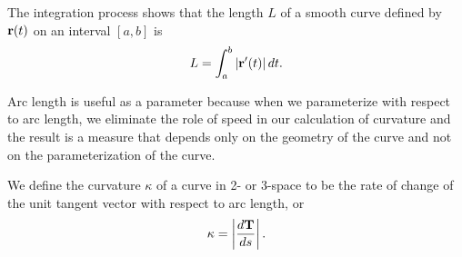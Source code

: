 


\begin{summary}
\item The integration process shows that the length $L$ of a smooth curve defined by $\mathbf{r}(t)$ on an interval $[a,b]$ is
\[L = \int_a^b |\mathbf{r}'(t)| \, dt.\]
\item Arc length is useful as a parameter because when we parameterize with respect to arc length, we eliminate the role of speed in our calculation of curvature and the result is a measure that depends only on the geometry of the curve and not on the parameterization of the curve.
\item We define the curvature $\kappa$ of a curve in 2- or 3-space to be the rate of change of the unit tangent vector with respect to arc length, or
    \[\kappa = \left\lvert \frac{d\mathbf{T}}{ds} \right\rvert.\]
\end{summary}







\nin \hrulefill



\clearpage